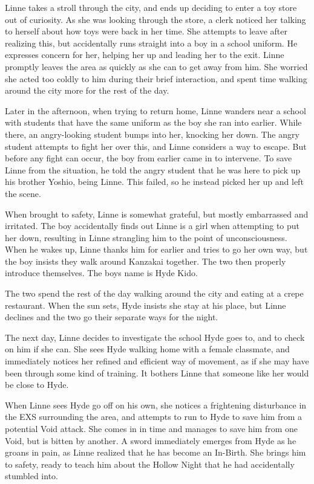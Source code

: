 \begin{tcolorbox}[breakable, colback=white, colframe=black!80,
  boxrule=0.6pt, arc=0mm, left=3mm, right=3mm, top=2mm, bottom=2mm]
\medskip
Linne takes a stroll through the city, and ends up deciding to enter a toy store out of curiosity. As she was looking through the store, a clerk noticed her talking to herself about how toys were back in her time. She attempts to leave after realizing this, but accidentally runs straight into a boy in a school uniform. He expresses concern for her, helping her up and leading her to the exit. Linne promptly leaves the area as quickly as she can to get away from him. She worried she acted too coldly to him during their brief interaction, and spent time walking around the city more for the rest of the day.\par
\medskip
Later in the afternoon, when trying to return home, Linne wanders near a school with students that have the same uniform as the boy she ran into earlier. While there, an angry-{}looking student bumps into her, knocking her down. The angry student attempts to fight her over this, and Linne considers a way to escape. But before any fight can occur, the boy from earlier came in to intervene. To save Linne from the situation, he told the angry student that he was here to pick up his brother \textquotedbl{}Yoshio\textquotedbl{}, being Linne. This failed, so he instead picked her up and left the scene.\par
\medskip
When brought to safety, Linne is somewhat grateful, but mostly embarrassed and irritated. The boy accidentally finds out Linne is a girl when attempting to put her down, resulting in Linne strangling him to the point of unconsciousness. When he wakes up, Linne thanks him for earlier and tries to go her own way, but the boy insists they walk around Kanzakai together. The two then properly introduce themselves. The boy\textquotesingle{}s name is Hyde Kido.\par
\medskip
The two spend the rest of the day walking around the city and eating at a crepe restaurant. When the sun sets, Hyde insists she stay at his place, but Linne declines and the two go their separate ways for the night.\par
\medskip
The next day, Linne decides to investigate the school Hyde goes to, and to check on him if she can. She sees Hyde walking home with a female classmate, and immediately notices her refined and efficient way of movement, as if she may have been through some kind of training. It bothers Linne that someone like her would be close to Hyde.\par
\medskip
When Linne sees Hyde go off on his own, she notices a frightening disturbance in the EXS surrounding the area, and attempts to run to Hyde to save him from a potential Void attack. She comes in in time and manages to save him from one Void, but is bitten by another. A sword immediately emerges from Hyde as he groans in pain, as Linne realized that he has become an In-{}Birth. She brings him to safety, ready to teach him about the Hollow Night that he had accidentally stumbled into.\par

\end{tcolorbox}
